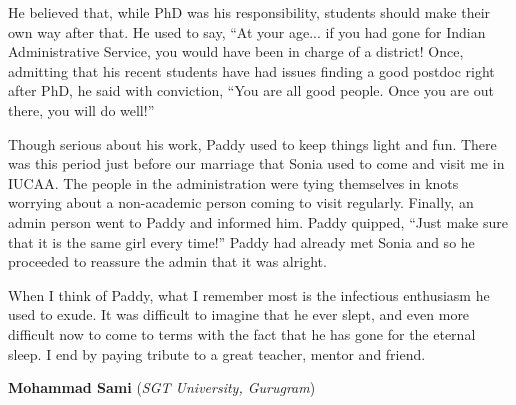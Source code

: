 \documentclass[prd, preprint, longbibliography, 12pt]{revtex4-2}
\begin{document}
He believed that, while PhD was his responsibility, students should make their own way after that. He used to say, ``At your age... if you had gone for Indian Administrative Service, you would have been in charge of a district! Once, admitting that his recent students have had issues finding a good postdoc right after PhD, he said with conviction, ``You are all good people. Once you are out there, you will do well!''

Though serious about his work, Paddy used to keep things light and fun. There was this period just before our marriage that Sonia used to come and visit me in IUCAA. The people in the administration were tying themselves in knots worrying about a non-academic person coming to visit regularly. Finally, an admin person went to Paddy and informed him. Paddy quipped, ``Just make sure that it is the same girl every time!'' Paddy had already met Sonia and so he proceeded to reassure the admin that it was alright.

When I think of Paddy, what I remember most is the infectious enthusiasm he used to exude. It was difficult to imagine that he ever slept, and even more difficult now to come to terms with the fact that he has gone for the eternal sleep. I end by paying tribute to a great teacher, mentor and friend.

 \bigskip
 
 \bigskip



\centerline{{\bf Mohammad Sami} ({\it SGT University, Gurugram})}
\medskip
{}
\end{document}
